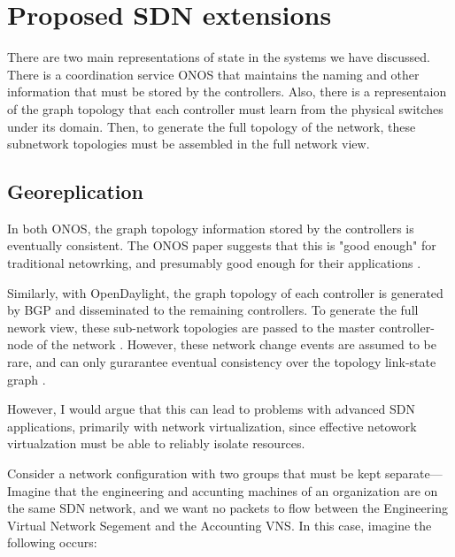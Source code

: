 \documentclass[letterpaper,twocolumn,10pt]{article}
\begin{document}


\section{Proposed SDN extensions}

There are two main representations of state in the systems we have discussed. There is a coordination service ONOS that maintains the naming and other information that must be stored by the controllers. Also, there is a representaion of the graph topology that each controller must learn from the physical switches under its domain. Then, to generate the full topology of the network, these subnetwork topologies must be assembled in the full network view.

\subsection{Georeplication}

In both ONOS, the graph topology information stored by the controllers is eventually consistent. The ONOS paper suggests that this is "good enough" for traditional netowrking, and presumably good enough for their applications \cite{berde2014onos}. 

Similarly, with OpenDaylight, the graph topology of each controller is generated by BGP and disseminated to the remaining controllers. To generate the full nework view, these sub-network topologies are passed to the master controller-node of the network \cite{ONV:wiki}. However, these network change events are assumed to be rare, and can only gurarantee eventual consistency over the topology link-state graph \cite{bgp:rfc}.

However, I would argue that this can lead to problems with advanced SDN applications, primarily with network virtualization, since effective netowork virtualzation must be able to reliably isolate resources.

Consider a network configuration with two groups that must be kept separate---Imagine that the engineering and accunting machines of an organization are on the same SDN network, and we want no packets to flow between the Engineering Virtual Network Segement and the Accounting VNS. In this case, imagine the following occurs:
\end{document}
